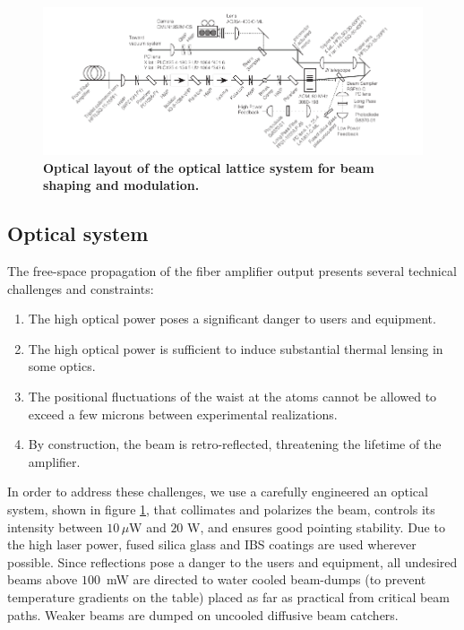 \documentclass[twocolumn,aps,pra,showpacs,preprintnumbers,bibnotes]{revtex4-1}
\begin{document}
\begin{figure}
  \begin{center}
    \includegraphics{fig/optical_layout_wide.pdf}
    \caption{\textbf{Optical layout of the optical lattice system for beam shaping and modulation.}}\label{fig:optical_layout}
  \end{center}
\end{figure}

\subsection{Optical system}
The free-space propagation of the fiber amplifier output presents several technical challenges and constraints:
\begin{enumerate}
  \item The high optical power poses a significant danger to users and equipment.
  \item The high optical power is sufficient to induce substantial thermal lensing in some optics. 
  \item The positional fluctuations of the waist at the atoms cannot be allowed to exceed a few microns between experimental realizations.
\item By construction, the beam is retro-reflected, threatening the lifetime of the amplifier. 
  \end{enumerate}

In order to address these challenges, we use a carefully engineered an optical system, shown in figure \ref{fig:optical_layout}, that collimates and polarizes the beam, controls its intensity between $10\,\mu$W and $20$ W, and ensures good pointing stability.
Due to the high laser power, fused silica glass and IBS coatings are used wherever possible.
Since reflections pose a danger to the users and equipment, all undesired beams above $100\,$ mW are directed to water cooled beam-dumps (to prevent temperature gradients on the table) placed as far as practical from critical beam paths.
Weaker beams are dumped on uncooled diffusive beam catchers.
\end{document}
